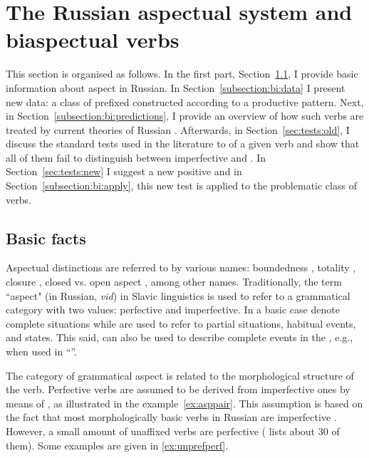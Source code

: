 \section{The Russian aspectual system and biaspectual verbs}\label{section:new:biaspectual}
This section is organised as follows. In the first part, Section~\ref{subsection:basic}, I provide basic information about aspect in Russian.  In Section~\ref{subsection:bi:data} I present new data: a class of prefixed  constructed according to a productive pattern. Next, in Section~\ref{subsection:bi:predictions}, I provide an overview of how such verbs are treated by current theories of Russian . Afterwards, in Section~\ref{sec:tests:old}, I discuss the standard tests used in the literature to  of a given verb and show that all of them fail to distinguish between imperfective and . In Section~\ref{sec:tests:new} I suggest a new positive  and in Section~\ref{subsection:bi:apply}, this new test is applied to the problematic class of verbs.

\subsection{Basic facts}\label{subsection:basic}
Aspectual distinctions  are referred to by various names: boundedness \citep{Avilova:76, Jakobson:57, Paducheva:96, Talmy:00}, totality \citep{Forsyth:70, Bondarko:71, Comrie:76, Dickey:00, Maslov:65}, closure \citep{Timberlake:82}, closed vs. open aspect \citep{Janda:07a}, among other names. Traditionally, the term ``aspect" (in Russian, \textit{vid}) in Slavic linguistics is used to refer to a grammatical category with two values: perfective and imperfective. In a basic case  denote complete situations while  are used to refer to partial situations, habitual events, and states. This said,  can also be used to describe complete events in the , e.g., when used in ``''. 

The category of grammatical aspect is related to the morphological structure of the verb. Perfective verbs are assumed to be derived from imperfective ones by means of , as illustrated in the example~\ref{ex:asppair}. This assumption is based on the fact that most morphologically basic verbs in Russian are imperfective \citep[see, e.g.,][]{Isachenko:60, Forsyth:70}. However, a small amount of unaffixed verbs are perfective (\citealt{Isachenko:60} lists about 30 of them). Some examples are given in \ref{ex:unprefperf}.

